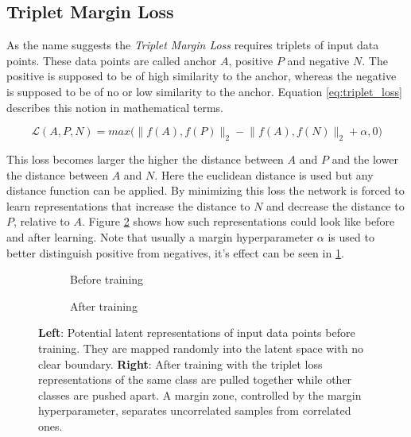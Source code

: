 \subsection{Triplet Margin Loss}\label{subsec:tirplet}

As the name suggests the \textit{Triplet Margin Loss} requires triplets of input data points. These data points are called anchor $A$, positive $P$ and negative $N$. The positive is supposed to be of high similarity to the anchor, whereas the negative is supposed to be of no or low similarity to the anchor. Equation \ref{eq:triplet_loss} describes this notion in mathematical terms.

\begin{equation}
   \mathcal{L}(A,P,N) = max\Big( \lVert f(A), f(P) \rVert_2 - \lVert f(A), f(N) \rVert_2 + \alpha, 0 \Big)
   \label{eq:triplet_loss}
\end{equation}

This loss becomes larger the higher the distance between $A$ and $P$ and the lower the distance between $A$ and $N$. 
Here the euclidean distance is used but any distance function can be applied. By minimizing this loss the network is forced to learn representations that increase the distance to $N$ and decrease the distance to $P$, relative to $A$. Figure \ref{fig:triplet_training} shows how such representations could look like before and after learning. Note that usually a margin hyperparameter $\alpha$ is used to better distinguish positive from negatives, it’s effect can be seen in \ref{subfig:triplet_after}.

\begin{figure}[h!]
  \centering
  \begin{subfigure}[b]{0.49\linewidth}
    \centering
    \scalebox{0.75}{}
    \caption{Before training}
  \end{subfigure}
  \begin{subfigure}[b]{0.49\linewidth}
    \centering
    \scalebox{0.75}{}
    \caption{After training}
    \label{subfig:triplet_after}
  \end{subfigure}
  \caption[Triplet loss example]{\textbf{Left}: Potential latent representations of input data points before training. They are mapped randomly into the latent space with no clear boundary. \textbf{Right}: After training with the triplet loss representations of the same class are pulled together while other classes are pushed apart. A margin zone, controlled by the margin hyperparameter, separates uncorrelated samples from correlated ones.}
  \label{fig:triplet_training}
\end{figure}

